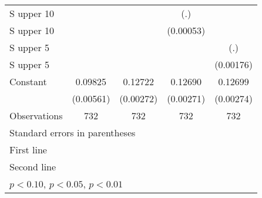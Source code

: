 \begin{table}[htbp]
\begin{tabular}{l*{4}{c}}
\addlinespace
S upper 10%
                    &                     &                     &         (.)         &                     \\
\addlinespace
S upper 10%
                    &                     &                     &   (0.00053)         &                     \\
\addlinespace
S upper 5%
                    &                     &                     &                     &         (.)         \\
\addlinespace
S upper 5%
                    &                     &                     &                     &   (0.00176)         \\
\addlinespace
Constant            &     0.09825\sym{***}&     0.12722\sym{***}&     0.12690\sym{***}&     0.12699\sym{***}\\
                    &   (0.00561)         &   (0.00272)         &   (0.00271)         &   (0.00274)         \\
\midrule
Observations        &         732         &         732         &         732         &         732         \\
\bottomrule
\multicolumn{5}{l}{\footnotesize Standard errors in parentheses}\\
\multicolumn{5}{l}{\footnotesize First line}\\
\multicolumn{5}{l}{\footnotesize Second line}\\
\multicolumn{5}{l}{\footnotesize \sym{*} \(p<0.10\), \sym{**} \(p<0.05\), \sym{***} \(p<0.01\)}\\
\end{tabular}
\end{table}
